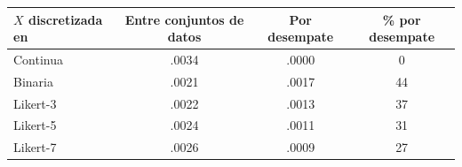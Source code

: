 \begin{tabular}{lccc}
\toprule
$X$ discretizada en & Entre conjuntos de datos & Por desempate & \% por desempate \\
\midrule
Continua & .0034 & .0000 & 0 \\
Binaria & .0021 & .0017 & 44 \\
Likert-3 & .0022 & .0013 & 37 \\
Likert-5 & .0024 & .0011 & 31 \\
Likert-7 & .0026 & .0009 & 27 \\
\bottomrule
\end{tabular}
